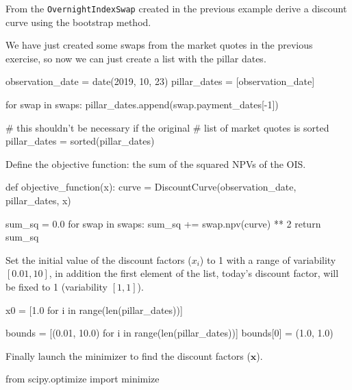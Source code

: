 \begin{question}
From the \texttt{OvernightIndexSwap} created in the previous example derive a discount curve using the bootstrap method.
\end{question}

\cprotEnv\begin{solution}
We have just created some swaps from the market quotes in the previous exercise, so now we can just create a list with the pillar dates.

\begin{ipython}
observation_date = date(2019, 10, 23)
pillar_dates = [observation_date]

for swap in swaps:
    pillar_dates.append(swap.payment_dates[-1])

# this shouldn't be necessary if the original
# list of market quotes is sorted
pillar_dates = sorted(pillar_dates)
\end{ipython}
Define the objective function: the sum of the squared NPVs of the OIS.
\begin{ipython}
def objective_function(x):
    curve = DiscountCurve(observation_date,
        pillar_dates, x)

    sum_sq = 0.0
    for swap in swaps:
        sum_sq += swap.npv(curve) ** 2
    return sum_sq
\end{ipython}
Set the initial value of the discount factors (\(x_i\)) to 1 with a range of variability \([ 0.01, 10]\), in addition the first element of the list, today's discount factor, will be fixed to 1 (variability \([1, 1]\)).

\begin{ipython}
x0 = [1.0 for i in range(len(pillar_dates))]

bounds = [(0.01, 10.0) for i in range(len(pillar_dates))]
bounds[0] = (1.0, 1.0)
\end{ipython}
Finally launch the minimizer to find the discount factors (\(\mathbf{x}\)).

\begin{ipython}
from scipy.optimize import minimize


\end{ipython}
\end{solution}
